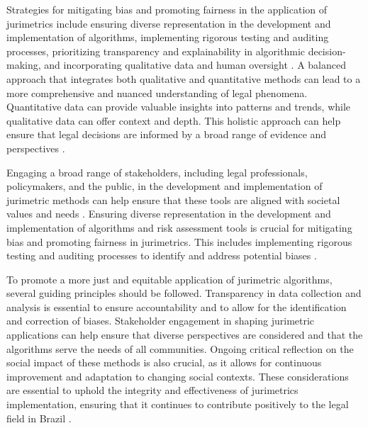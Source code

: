 Strategies for mitigating bias and promoting fairness in the application of jurimetrics include ensuring diverse representation in the development and implementation of algorithms, implementing rigorous testing and auditing processes, prioritizing transparency and explainability in algorithmic decision-making, and incorporating qualitative data and human oversight \cite{10.1590/dados.2022.65.3.267,10.1080/07329113.2015.1046739}. A balanced approach that integrates both qualitative and quantitative methods can lead to a more comprehensive and nuanced understanding of legal phenomena. Quantitative data can provide valuable insights into patterns and trends, while qualitative data can offer context and depth. This holistic approach can help ensure that legal decisions are informed by a broad range of evidence and perspectives \cite{unger2021process}.

Engaging a broad range of stakeholders, including legal professionals, policymakers, and the public, in the development and implementation of jurimetric methods can help ensure that these tools are aligned with societal values and needs \cite{unger2021process}. Ensuring diverse representation in the development and implementation of algorithms and risk assessment tools is crucial for mitigating bias and promoting fairness in jurimetrics. This includes implementing rigorous testing and auditing processes to identify and address potential biases \cite{10.1590/dados.2022.65.3.267,10.1057/s41599-020-00557-0}.

To promote a more just and equitable application of jurimetric algorithms, several guiding principles should be followed. Transparency in data collection and analysis is essential to ensure accountability and to allow for the identification and correction of biases. Stakeholder engagement in shaping jurimetric applications can help ensure that diverse perspectives are considered and that the algorithms serve the needs of all communities. Ongoing critical reflection on the social impact of these methods is also crucial, as it allows for continuous improvement and adaptation to changing social contexts. These considerations are essential to uphold the integrity and effectiveness of jurimetrics implementation, ensuring that it continues to contribute positively to the legal field in Brazil \cite{10.1007/s11186-021-09453-1,international2015,10.3390/fi9040068,10.1080/07329113.2015.1046739}.

